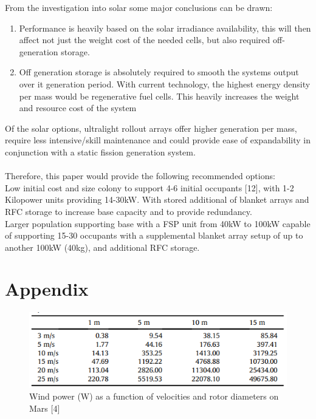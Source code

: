 \documentclass[12pt]{IEEEtran}
\begin{document}
From the investigation into solar some major conclusions can be drawn:
\begin{enumerate}
	\item Performance is heavily based on the solar irradiance availability, this will then affect not just the weight cost of the needed cells, but also required off-generation storage.
	\item Off generation storage is absolutely required to smooth the systems output over it generation period. With current technology, the highest energy density per mass would be regenerative fuel cells. This heavily increases the weight and resource cost of the system
\end{enumerate}

Of the solar options, ultralight rollout arrays offer higher generation per mass, require less intensive/skill maintenance and could provide ease of expandability in conjunction with a static fission generation system.
\\ \\
Therefore, this paper would provide the following recommended options:
\\ Low initial cost and size colony to support 4-6 initial occupants [12], with 1-2 Kilopower units providing 14-30kW. With stored additional of blanket arrays and RFC storage to increase base capacity and to provide redundancy.
\\
Larger population supporting base with a FSP unit from 40kW to 100kW capable of supporting 15-30 occupants with a supplemental blanket array setup of up to another 100kW (40kg), and additional RFC storage.
\clearpage
\section*{Appendix}
\begin{figure}[h]
	\includegraphics[width=\linewidth]{marswind}
	\caption{Wind power (W) as a function of velocities and rotor diameters on Mars {[4]}}
\end{figure}
\end{document}
